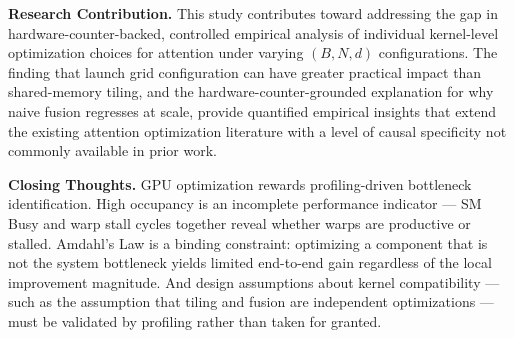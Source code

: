 \documentclass{article}
\begin{document}
\textbf{Research Contribution.}
This study contributes toward addressing the gap in hardware-counter-backed,
controlled empirical analysis of individual kernel-level optimization choices
for attention under varying $(B,N,d)$ configurations. The finding that launch
grid configuration can have greater practical impact than shared-memory tiling,
and the hardware-counter-grounded explanation for why naive fusion regresses
at scale, provide quantified empirical insights that extend the existing
attention optimization literature with a level of causal specificity not
commonly available in prior work.

\textbf{Closing Thoughts.}
GPU optimization rewards profiling-driven bottleneck identification. High
occupancy is an incomplete performance indicator — SM Busy and warp stall
cycles together reveal whether warps are productive or stalled. Amdahl's
Law is a binding constraint: optimizing a component that is not the system
bottleneck yields limited end-to-end gain regardless of the local improvement
magnitude. And design assumptions about kernel compatibility — such as the
assumption that tiling and fusion are independent optimizations — must be
validated by profiling rather than taken for granted.

\medskip
\printbibliography
\end{document}
